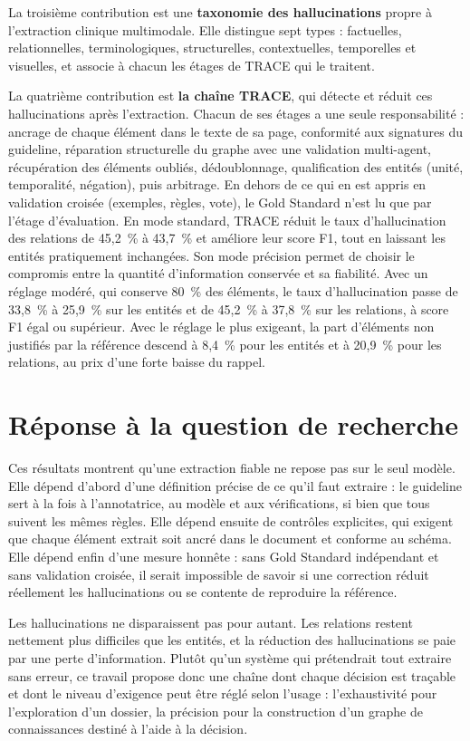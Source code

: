 La troisième contribution est une \textbf{taxonomie des hallucinations} propre à l'extraction clinique multimodale. Elle distingue sept types : factuelles, relationnelles, terminologiques, structurelles, contextuelles, temporelles et visuelles, et associe à chacun les étages de TRACE qui le traitent.

La quatrième contribution est \textbf{la chaîne TRACE}, qui détecte et réduit ces hallucinations après l'extraction. Chacun de ses étages a une seule responsabilité : ancrage de chaque élément dans le texte de sa page, conformité aux signatures du guideline, réparation structurelle du graphe avec une validation multi-agent, récupération des éléments oubliés, dédoublonnage, qualification des entités (unité, temporalité, négation), puis arbitrage. En dehors de ce qui en est appris en validation croisée (exemples, règles, vote), le Gold Standard n'est lu que par l'étage d'évaluation. En mode standard, TRACE réduit le taux d'hallucination des relations de 45,2~\% à 43,7~\% et améliore leur score F1, tout en laissant les entités pratiquement inchangées. Son mode précision permet de choisir le compromis entre la quantité d'information conservée et sa fiabilité. Avec un réglage modéré, qui conserve 80~\% des éléments, le taux d'hallucination passe de 33,8~\% à 25,9~\% sur les entités et de 45,2~\% à 37,8~\% sur les relations, à score F1 égal ou supérieur. Avec le réglage le plus exigeant, la part d'éléments non justifiés par la référence descend à 8,4~\% pour les entités et à 20,9~\% pour les relations, au prix d'une forte baisse du rappel.

\section*{Réponse à la question de recherche}

Ces résultats montrent qu'une extraction fiable ne repose pas sur le seul modèle. Elle dépend d'abord d'une définition précise de ce qu'il faut extraire : le guideline sert à la fois à l'annotatrice, au modèle et aux vérifications, si bien que tous suivent les mêmes règles. Elle dépend ensuite de contrôles explicites, qui exigent que chaque élément extrait soit ancré dans le document et conforme au schéma. Elle dépend enfin d'une mesure honnête : sans Gold Standard indépendant et sans validation croisée, il serait impossible de savoir si une correction réduit réellement les hallucinations ou se contente de reproduire la référence.

Les hallucinations ne disparaissent pas pour autant. Les relations restent nettement plus difficiles que les entités, et la réduction des hallucinations se paie par une perte d'information. Plutôt qu'un système qui prétendrait tout extraire sans erreur, ce travail propose donc une chaîne dont chaque décision est traçable et dont le niveau d'exigence peut être réglé selon l'usage : l'exhaustivité pour l'exploration d'un dossier, la précision pour la construction d'un graphe de connaissances destiné à l'aide à la décision.

